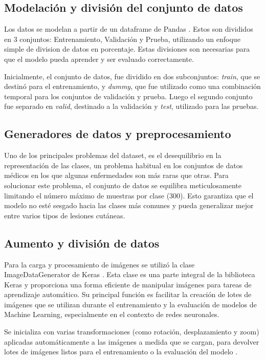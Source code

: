 \subsection{Modelación y división del conjunto de datos}

Los datos se modelan a partir de un dataframe de Pandas . Estos son divididos en 3 conjuntos: Entrenamiento, Validación y Prueba, utilizando un enfoque simple de division de datos en porcentaje. Estas divisiones son necesarias para que el modelo pueda aprender y ser evaluado correctamente.

Inicialmente, el conjunto de datos, fue dividido en dos subconjuntos: \textit{train}, que se destinó para el entrenamiento, y \textit{dummy}, que fue utilizado como una combinación temporal para los conjuntos de validación y prueba. Luego el segundo conjunto fue separado en \textit{valid}, destinado a la validación y \textit{test}, utilizado para las pruebas.

\subsection{Generadores de datos y preprocesamiento}

Uno de los principales problemas del dataset, es el desequilibrio en la representación de las clases, un problema habitual en los conjuntos de datos médicos en los que algunas enfermedades son más raras que otras. Para solucionar este problema, el conjunto de datos se equilibra meticulosamente limitando el número máximo de muestras por clase ($300$). Esto garantiza que el modelo no esté sesgado hacia las clases más comunes y pueda generalizar mejor entre varios tipos de lesiones cutáneas.

\subsection{Aumento y división de datos}

Para la carga y procesamiento de imágenes se utilizó la clase ImageDataGenerator de Keras . Esta clase es una parte integral de la biblioteca Keras y proporciona una forma eficiente de manipular imágenes para tareas de aprendizaje automático. Su principal función es facilitar la creación de lotes de imágenes que se utilizan durante el entrenamiento y la evaluación de modelos de Machine Learning, especialmente en el contexto de redes neuronales. 

Se inicializa con varias transformaciones (como rotación, desplazamiento y zoom) aplicadas automáticamente a las imágenes a medida que se cargan, para devolver lotes de imágenes listos para el entrenamiento o la evaluación del modelo .

